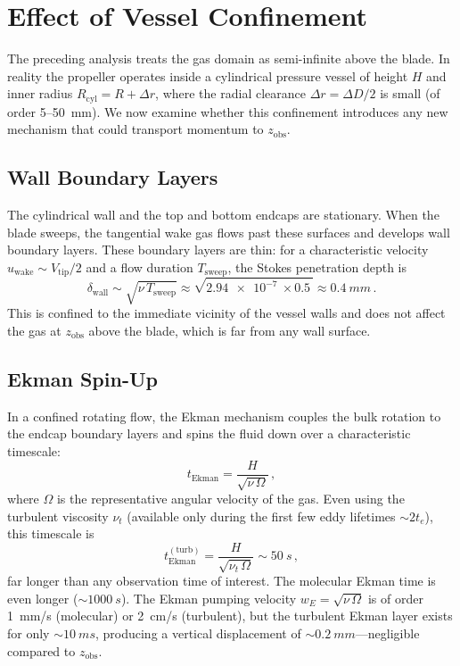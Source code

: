 \documentclass[11pt,a4paper]{article}
\begin{document}
\section{Effect of Vessel Confinement}
\label{sec:confinement}

The preceding analysis treats the gas domain as semi-infinite above the
blade. In reality the propeller operates inside a cylindrical pressure
vessel of height $H$ and inner radius $R_\mathrm{cyl} = R + \Delta r$,
where the radial clearance $\Delta r = \Delta D/2$ is small (of order
\SI{5}{}--\SI{50}{mm}). We now examine whether this confinement
introduces any new mechanism that could transport momentum to
$z_\mathrm{obs}$.

\subsection{Wall Boundary Layers}

The cylindrical wall and the top and bottom endcaps are stationary.
When the blade sweeps, the tangential wake gas flows past these
surfaces and develops wall boundary layers. These boundary layers are
thin: for a characteristic velocity $u_\mathrm{wake} \sim V_\mathrm{tip}/2$
and a flow duration $T_\mathrm{sweep}$, the Stokes penetration depth is
\begin{equation}
  \delta_\mathrm{wall} \sim \sqrt{\nu\, T_\mathrm{sweep}}
    \approx \sqrt{\SI{2.94e-7}{} \times \SI{0.5}{}}
    \approx \SI{0.4}{mm}\,.
\end{equation}
This is confined to the immediate vicinity of the vessel walls and does
not affect the gas at $z_\mathrm{obs}$ above the blade, which is far
from any wall surface.

\subsection{Ekman Spin-Up}

In a confined rotating flow, the Ekman mechanism couples the bulk
rotation to the endcap boundary layers and spins the fluid down over
a characteristic timescale:
\begin{equation}
  t_\mathrm{Ekman} = \frac{H}{\sqrt{\nu\,\Omega}}\,,
  \label{eq:tEkman}
\end{equation}
where $\Omega$ is the representative angular velocity of the gas.
Even using the turbulent viscosity $\nu_t$ (available only during the
first few eddy lifetimes $\sim 2 t_e$), this timescale is
\begin{equation}
  t_\mathrm{Ekman}^{(\mathrm{turb})}
    = \frac{H}{\sqrt{\nu_t\,\Omega}}
    \sim \SI{50}{s}\,,
\end{equation}
far longer than any observation time of interest. The molecular Ekman
time is even longer ($\sim\SI{1000}{s}$). The Ekman pumping velocity
$w_E = \sqrt{\nu\,\Omega}$ is of order \SI{1}{mm/s} (molecular) or
\SI{2}{cm/s} (turbulent), but the turbulent Ekman layer exists for
only $\sim\SI{10}{ms}$, producing a vertical displacement of
$\sim\SI{0.2}{mm}$---negligible compared to $z_\mathrm{obs}$.
\end{document}
